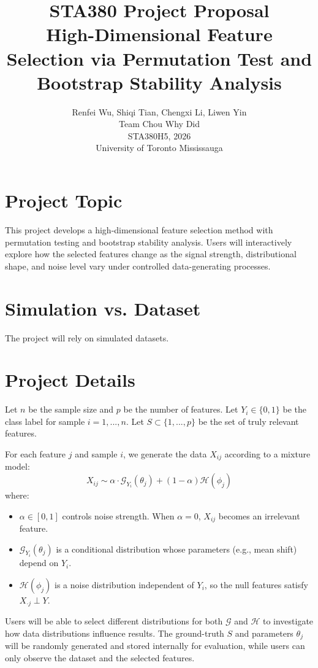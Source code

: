 \documentclass{article}
\title{
    \textbf{\fontsize{16}{19.2}\selectfont STA380 Project Proposal}\\[0.5em]
    \fontsize{11}{13.2}\selectfont High-Dimensional Feature Selection via Permutation Test and Bootstrap Stability Analysis
}
\author{
    \fontsize{11}{13.2}\selectfont
    Renfei Wu, Shiqi Tian, Chengxi Li, Liwen Yin \\
    \fontsize{11}{13.2}\selectfont
    Team Chou Why Did \\
    \fontsize{11}{13.2}\selectfont
    STA380H5, 2026 \\
    \fontsize{11}{13.2}\selectfont
    University of Toronto Mississauga
}
\date{}
\begin{document}
\maketitle

\section{Project Topic}
This project develops a high-dimensional feature selection method with permutation testing and bootstrap stability analysis. Users will interactively explore how the selected features change as the signal strength, distributional shape, and noise level vary under controlled data-generating processes.

\section{Simulation vs. Dataset}
The project will rely on simulated datasets.

\section{Project Details}
Let $n$ be the sample size and $p$ be the number of features. Let $Y_i \in \{0,1\}$ be the class label for sample $i=1,...,n$. Let $S\subset \{1,...,p\}$ be the set of truly relevant features. 

For each feature $j$ and sample $i$, we generate the data $X_{ij}$ according to a mixture model:
\[
X_{ij} \sim 
\alpha \cdot \mathcal{G}_{Y_i}(\theta_j) + (1-\alpha) \mathcal{H}(\phi_j)
\]
where:
\begin{itemize}[itemsep=0pt, parsep=0pt, topsep=0pt]
    \item $\alpha \in [0,1]$ controls noise strength. When $\alpha=0$, $X_{ij}$ becomes an irrelevant feature.
    \item $\mathcal{G}_{Y_i}(\theta_j)$ is a conditional distribution whose parameters (e.g., mean shift) depend on $Y_i$.
    \item $\mathcal{H}(\phi_j)$ is a noise distribution independent of $Y_i$, so the null features satisfy $X_{\cdot j} \perp Y$.
\end{itemize}

Users will be able to select different distributions for both $\mathcal{G}$ and $\mathcal{H}$ to investigate how data distributions influence results. The ground-truth $S$ and parameters $\theta_j$ will be randomly generated and stored internally for evaluation, while users can only observe the dataset and the selected features.
\end{document}
